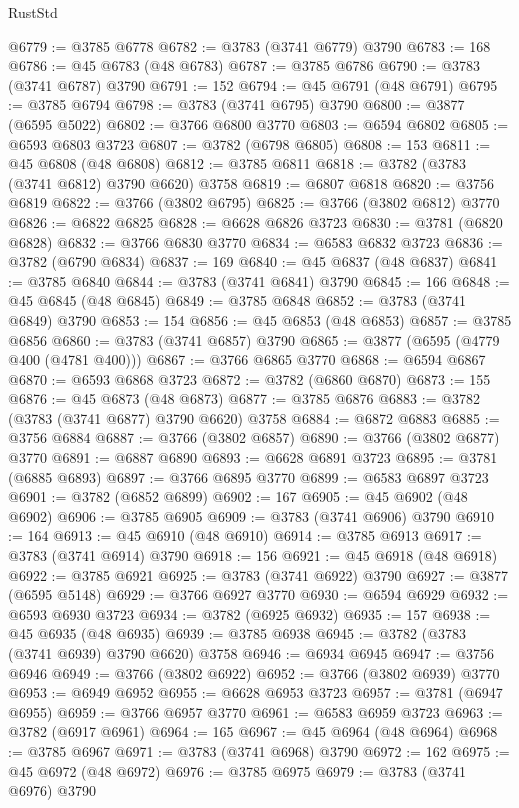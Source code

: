 \begin{lexlean}{RustStd}
\begin{coremodule}
@6779 := @3785 @6778
@6782 := @3783 (@3741 @6779) @3790
@6783 := 168
@6786 := @45 @6783 (@48 @6783)
@6787 := @3785 @6786
@6790 := @3783 (@3741 @6787) @3790
@6791 := 152
@6794 := @45 @6791 (@48 @6791)
@6795 := @3785 @6794
@6798 := @3783 (@3741 @6795) @3790
@6800 := @3877 (@6595 @5022)
@6802 := @3766 @6800 @3770
@6803 := @6594 @6802
@6805 := @6593 @6803 @3723
@6807 := @3782 (@6798 @6805)
@6808 := 153
@6811 := @45 @6808 (@48 @6808)
@6812 := @3785 @6811
@6818 := @3782 (@3783 (@3741 @6812) @3790 @6620) @3758
@6819 := @6807 @6818
@6820 := @3756 @6819
@6822 := @3766 (@3802 @6795)
@6825 := @3766 (@3802 @6812) @3770
@6826 := @6822 @6825
@6828 := @6628 @6826 @3723
@6830 := @3781 (@6820 @6828)
@6832 := @3766 @6830 @3770
@6834 := @6583 @6832 @3723
@6836 := @3782 (@6790 @6834)
@6837 := 169
@6840 := @45 @6837 (@48 @6837)
@6841 := @3785 @6840
@6844 := @3783 (@3741 @6841) @3790
@6845 := 166
@6848 := @45 @6845 (@48 @6845)
@6849 := @3785 @6848
@6852 := @3783 (@3741 @6849) @3790
@6853 := 154
@6856 := @45 @6853 (@48 @6853)
@6857 := @3785 @6856
@6860 := @3783 (@3741 @6857) @3790
@6865 := @3877 (@6595 (@4779 @400 (@4781 @400)))
@6867 := @3766 @6865 @3770
@6868 := @6594 @6867
@6870 := @6593 @6868 @3723
@6872 := @3782 (@6860 @6870)
@6873 := 155
@6876 := @45 @6873 (@48 @6873)
@6877 := @3785 @6876
@6883 := @3782 (@3783 (@3741 @6877) @3790 @6620) @3758
@6884 := @6872 @6883
@6885 := @3756 @6884
@6887 := @3766 (@3802 @6857)
@6890 := @3766 (@3802 @6877) @3770
@6891 := @6887 @6890
@6893 := @6628 @6891 @3723
@6895 := @3781 (@6885 @6893)
@6897 := @3766 @6895 @3770
@6899 := @6583 @6897 @3723
@6901 := @3782 (@6852 @6899)
@6902 := 167
@6905 := @45 @6902 (@48 @6902)
@6906 := @3785 @6905
@6909 := @3783 (@3741 @6906) @3790
@6910 := 164
@6913 := @45 @6910 (@48 @6910)
@6914 := @3785 @6913
@6917 := @3783 (@3741 @6914) @3790
@6918 := 156
@6921 := @45 @6918 (@48 @6918)
@6922 := @3785 @6921
@6925 := @3783 (@3741 @6922) @3790
@6927 := @3877 (@6595 @5148)
@6929 := @3766 @6927 @3770
@6930 := @6594 @6929
@6932 := @6593 @6930 @3723
@6934 := @3782 (@6925 @6932)
@6935 := 157
@6938 := @45 @6935 (@48 @6935)
@6939 := @3785 @6938
@6945 := @3782 (@3783 (@3741 @6939) @3790 @6620) @3758
@6946 := @6934 @6945
@6947 := @3756 @6946
@6949 := @3766 (@3802 @6922)
@6952 := @3766 (@3802 @6939) @3770
@6953 := @6949 @6952
@6955 := @6628 @6953 @3723
@6957 := @3781 (@6947 @6955)
@6959 := @3766 @6957 @3770
@6961 := @6583 @6959 @3723
@6963 := @3782 (@6917 @6961)
@6964 := 165
@6967 := @45 @6964 (@48 @6964)
@6968 := @3785 @6967
@6971 := @3783 (@3741 @6968) @3790
@6972 := 162
@6975 := @45 @6972 (@48 @6972)
@6976 := @3785 @6975
@6979 := @3783 (@3741 @6976) @3790

\end{coremodule}
\end{lexlean}
